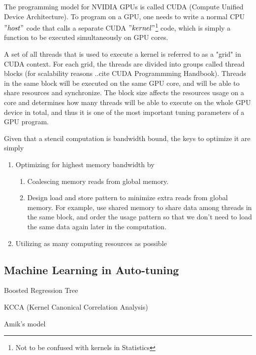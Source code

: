 The programming model for NVIDIA GPUs is called CUDA (Compute Unified Device Architecture). To program on a GPU, one needs to write a normal CPU $"host"$ code that calls a separate CUDA $"kernel"$\footnote{Not to be confused with kernels in Statistics} code, which is simply a function to be executed simultaneously on GPU cores.

A set of all threads that is used to execute a kernel is referred to as a "grid" in CUDA context. For each grid, the threads are divided into groups called thread blocks (for scalability reasons ..cite CUDA Programmming Handbook). Threads in the same block will be executed on the same GPU core, and will be able to share resources and synchronize. The block size affects the resources usage on a core and determines how many threads will be able to execute on the whole GPU device in total, and thus it is one of the most important tuning parameters of a GPU program.

Given that a stencil computation is bandwidth bound, the keys to optimize it are simply
\begin{enumerate}
	\item Optimizing for highest memory bandwidth by
		\begin{enumerate}
			\item Coalescing memory reads from global memory.
			\item Design load and store pattern to minimize extra reads from global memory. For example, use shared memory to share data among threads in the same block, and order the usage pattern so that we don't need to load the same data again later in the computation.
		\end{enumerate}
	\item Utilizing as many computing resources as possible
\end{enumerate}

\subsection{Machine Learning in Auto-tuning}
Boosted Regression Tree

KCCA (Kernel Canonical Correlation Analysis)

Amik's model

